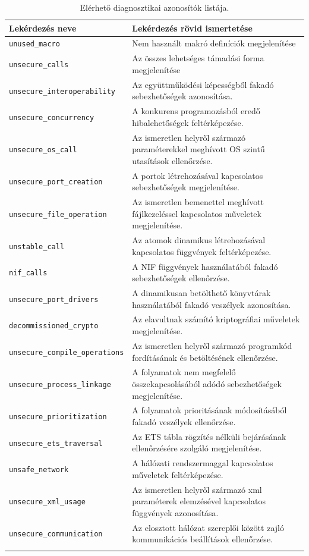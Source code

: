 \begin{longtable}{|m{}|m{}|}
 \hline
 Lekérdezés neve & Lekérdezés rövid ismertetése \\ [0.5ex] 
 \hline\hline
 \verb|unused_macro| & Nem használt makró definíciók megjelenítése \\ \hline
 \verb|unsecure_calls| & Az összes lehetséges támadási forma megjelenítése \\ \hline
 \verb|unsecure_interoperability| & Az együttműködési képességből fakadó sebezhetőségek azonosítása. \\ \hline
 \verb|unsecure_concurrency| & A konkurens programozásból eredő hibalehetőségek feltérképezése. \\ \hline
 \verb|unsecure_os_call| & Az ismeretlen helyről származó paraméterekkel meghívott OS szintű utasítások ellenőrzése. \\ \hline
 \verb|unsecure_port_creation| & A portok létrehozásával kapcsolatos sebezhetőségek megjelenítése. \\ \hline
 \verb|unsecure_file_operation| & Az ismeretlen bemenettel meghívott fájlkezeléssel kapcsolatos műveletek megjelenítése. \\ \hline
 \verb|unstable_call| & Az atomok dinamikus létrehozásával kapcsolatos függvények feltérképezése. \\ \hline
 \verb|nif_calls| & A NIF függvények használatából fakadó sebezhetőségek ellenőrzése. \\ \hline
 \verb|unsecure_port_drivers| & A dinamikusan betölthető könyvtárak használatából fakadó veszélyek azonosítása. \\ \hline
 \verb|decommissioned_crypto| & Az elavultnak számító kriptográfiai műveletek megjelenítése. \\ \hline
 \verb|unsecure_compile_operations| & Az ismeretlen helyről származó programkód fordításának és betöltésének ellenőrzése. \\ \hline
 \verb|unsecure_process_linkage| & A folyamatok nem megfelelő összekapcsolásából adódó sebezhetőségek megjelenítése. \\ \hline
 \verb|unsecure_prioritization| & A folyamatok prioritásának módosításából fakadó veszélyek ellenőrzése. \\ \hline
 \verb|unsecure_ets_traversal| & Az ETS tábla rögzítés nélküli bejárásának ellenőrzésére szolgáló megjelenítése. \\ \hline
 \verb|unsafe_network| & A hálózati rendszermaggal kapcsolatos műveletek feltérképezése. \\ \hline
 \verb|unsecure_xml_usage| & Az ismeretlen helyről származó xml paraméterek elemzésével kapcsolatos függvények azonosítása. \\ \hline
 \verb|unsecure_communication| & Az elosztott hálózat szereplői között zajló kommunikációs beállítások ellenőrzése. \\ [1ex] 
 \hline
\caption{Elérhető diagnosztikai azonosítók listája.}
\label{table:1}
\end{longtable}

